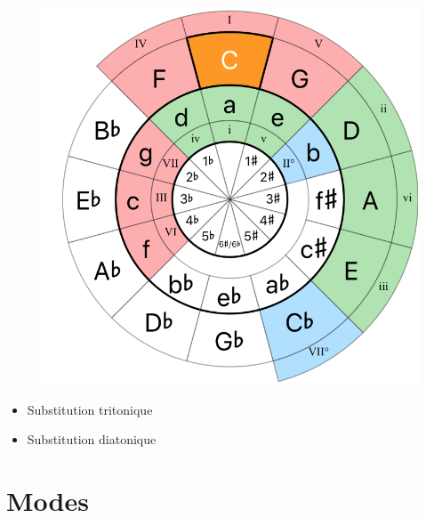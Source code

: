 \documentclass{article}
\begin{document}
\begin{figure}[h!]
	\centering
	\hspace*{-1cm}
	\includegraphics[scale=0.3, trim= {0cm 0cm 0cm 0cm}, clip]{Circle_5th.png}
	\caption{ }
	\label{fig}
\end{figure}

\begin{itemize}
	\item Substitution tritonique
	\item Substitution diatonique
\end{itemize}

\newpage
\section{Modes}
\end{document}

